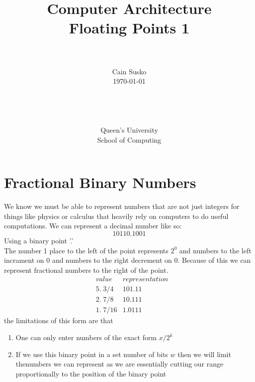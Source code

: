 \documentclass[12pt]{book}
\newcommand{\classID}{Floating Points 1}
\newcommand{\coursename}{Computer Architecture}
\begin{document}
\date{}
\setlength{\parindent}{0em}  %

\title{\coursename\\\classID}

\author{\\ \\ Cain Susko\\\today \\ \\ \\ \\ \\
        Queen's University \\School of Computing} 
 

\maketitle
\pagebreak

  

\section*{Fractional Binary Numbers}
We know we must be able to represent numbers that are not just integers for things like physics or calculus
        that heavily rely on computers to do useful computations.
We can represent a decimal number like so:
\[10110.1001\]
Using a binary point '.'\\
The number 1 place to the left of the point represents $2^0$ 
	and numbers to the left incrament on $0$ and numbers to the right decrement on $0$.
Because of this we can represent fractional numbers to the right of the point.
\begin{align*}
        &value  &representation\\
        &5.\;{3}/{4}   &101.11\\
        &2.\;{7}/{8}   &10.111\\
        &1.\;{7}/{16}  &1.0111
\end{align*}
the limitations of this form are that 
\begin{enumerate}
        \item One can only enter numbers of the exact form $x/2^k$
        \item If we use this binary point in a set number of bits $w$
                then we will limit thenumbers we can represent as we are 
                essentially cutting our range proportionally to the position
                of the binary point
\end{enumerate}
\end{document}
